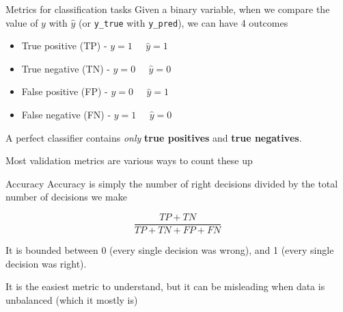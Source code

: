 \documentclass[
  10pt,
  ignorenonframetext,
  aspectratio=169]{beamer}
\providecommand{\tightlist}{%
  \setlength{\itemsep}{0pt}\setlength{\parskip}{0pt}}
\begin{document}
\begin{frame}[fragile]{Metrics for classification tasks}
\protect\hypertarget{metrics-for-classification-tasks}{}
Given a binary variable, when we compare the value of \(y\) with
\(\hat{y}\) (or \texttt{y\_true} with \texttt{y\_pred}), we can have 4
outcomes

\begin{itemize}
\tightlist
\item
  True positive (TP) - \(y=1 \;\;\;\;\; \hat{y}=1\)
\item
  True negative (TN) - \(y=0 \;\;\;\;\; \hat{y}=0\)
\item
  False positive (FP) - \(y=0 \;\;\;\;\; \hat{y}=1\)
\item
  False negative (FN) - \(y=1 \;\;\;\;\; \hat{y}=0\)
\end{itemize}

A perfect classifier contains \emph{only} \textbf{true positives} and
\textbf{true negatives}.

Most validation metrics are various ways to count these up
\end{frame}

\begin{frame}{Accuracy}
\protect\hypertarget{accuracy}{}
Accuracy is simply the number of right decisions divided by the total
number of decisions we make

\[\frac{TP+TN}{TP+TN+FP+FN}\]

It is bounded between 0 (every single decision was wrong), and 1 (every
single decision was right).

It is the easiest metric to understand, but it can be misleading when
data is unbalanced (which it mostly is)
\end{frame}
\end{document}
